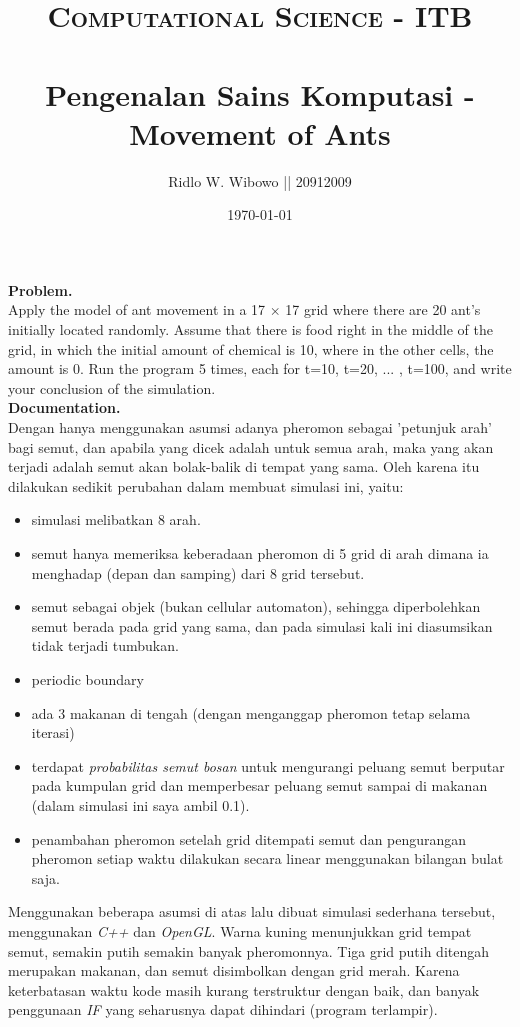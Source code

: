 \documentclass[paper=a4, fontsize=11pt]{scrartcl}
\title{	
\normalfont \normalsize 
\textsc{Computational Science - ITB} \\ [25pt] %
\horrule{0.5pt} \\[0.4cm] %
\small  Pengenalan Sains Komputasi - Movement of Ants\\ %
}
\author{\small{Ridlo W. Wibowo || 20912009}} %
\date{\normalsize\today} %
\numberwithin{equation}{section} %
\numberwithin{figure}{section} %
\numberwithin{table}{section} %
\begin{document}
\maketitle %

\large \textbf{Problem.}\\
Apply the model of ant movement in a 17 $\times$ 17 grid where there are 20 ant's initially located randomly. Assume that there is food right in the middle of the grid, in which the initial amount of chemical is 10, where in the other cells, the amount is 0. Run the program 5 times, each for t=10, t=20, ... , t=100, and write your conclusion of the simulation.\\

\vspace{1cm}
\large \textbf{Documentation.}\\
Dengan hanya menggunakan asumsi adanya pheromon sebagai 'petunjuk arah' bagi semut, dan apabila yang dicek adalah untuk semua arah, maka yang akan terjadi adalah semut akan bolak-balik di tempat yang sama.
Oleh karena itu dilakukan sedikit perubahan dalam membuat simulasi ini, yaitu:
\begin{itemize}
\item simulasi melibatkan 8 arah.
\item semut hanya memeriksa keberadaan pheromon di 5 grid  di arah dimana ia menghadap (depan dan samping) dari 8 grid tersebut.
\item semut sebagai objek (bukan cellular automaton), sehingga diperbolehkan semut berada pada grid yang sama, dan pada simulasi kali ini diasumsikan tidak terjadi tumbukan.
\item periodic boundary
\item ada 3 makanan di tengah (dengan menganggap pheromon tetap selama iterasi)
\item terdapat \textit{probabilitas semut bosan} untuk mengurangi peluang semut berputar pada kumpulan grid dan memperbesar peluang semut sampai di makanan (dalam simulasi ini saya ambil 0.1).
\item penambahan pheromon setelah grid ditempati semut dan pengurangan pheromon setiap waktu dilakukan secara linear menggunakan bilangan bulat saja.
\end{itemize}

Menggunakan beberapa asumsi di atas lalu dibuat simulasi sederhana tersebut, menggunakan \textit{C++} dan \textit{OpenGL}. Warna kuning menunjukkan grid tempat semut, semakin putih semakin banyak pheromonnya.
Tiga grid putih ditengah merupakan makanan, dan semut disimbolkan dengan grid merah. Karena keterbatasan waktu kode masih kurang terstruktur dengan baik, dan banyak penggunaan \textit{IF} yang seharusnya dapat dihindari (program terlampir).\\
\end{document}
